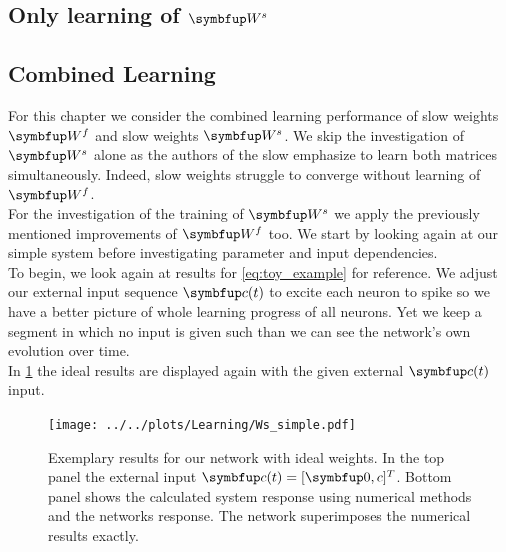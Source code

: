
\subsection{Only learning of $\bmu{W}^s$}
\subsection{Combined Learning}\label{ssec:combined_learning}
For this chapter we consider the combined learning performance of slow weights $\bmu{W}^f$ and slow weights $\bmu{W}^s$. We skip the investigation of $\bmu{W}^s$ alone as the authors of the slow emphasize to learn both matrices simultaneously. Indeed, slow weights struggle to converge without learning of $\bmu{W}^f$.\\
For the investigation of the training of $\bmu{W}^s$ we apply the previously mentioned improvements of $\bmu{W}^f$ too. We start by looking again at our simple system before investigating parameter and input dependencies.\\
To begin, we look again at results for \cref{eq:toy_example} for reference. We adjust our external input sequence $\bmu{c}(t)$ to excite each neuron to spike so we have a better picture of whole learning progress of all neurons. Yet we keep a segment in which no input is given such than we can see the network's own evolution over time.\\
In \cref{fig:Ws_intro} the ideal results are displayed again with the given external $\bmu{c}(t)$ input.\\
\begin{figure}
	\centering
	\texttt{[image: ../../plots/Learning/Ws\_simple.pdf]}
	\caption{Exemplary results for our network with ideal weights. In the top panel the external input $\bmu{c}(t) = [\bmu{0},c]^T$. Bottom panel shows the calculated system response using numerical methods and the networks response. The network superimposes the numerical results exactly.}
	\label{fig:Ws_intro}
\end{figure}

